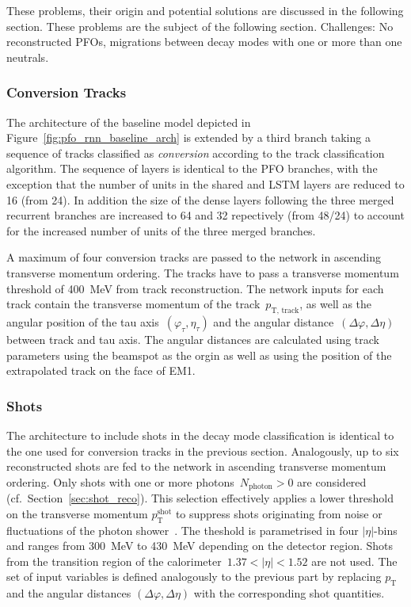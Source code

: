 These problems, their origin and potential solutions are discussed
in the following section.
These problems are the subject of the following section.
Challenges: No reconstructed PFOs, migrations between decay modes with one or
more than one neutrals.


\subsubsection{Conversion Tracks}

The architecture of the baseline model depicted in
Figure~\ref{fig:pfo_rnn_baseline_arch} is extended by a third branch taking a
sequence of tracks classified as \emph{conversion} according to the track
classification algorithm. The sequence of layers is identical to the PFO
branches, with the exception that the number of units in the shared and LSTM
layers are reduced to 16 (from 24). In addition the size of the dense layers
following the three merged recurrent branches are increased to 64 and 32
repectively (from 48/24) to account for the increased number of units of the
three merged branches.

A maximum of four conversion tracks are passed to the network in ascending
transverse momentum ordering. The tracks have to pass a transverse momentum
threshold of \SI{400}{\MeV} from track reconstruction. The network inputs for
each track contain the transverse momentum of the track~$p_\text{T, track}$, as
well as the angular position of the tau axis~$(\varphi_\tau, \eta_\tau)$ and the
angular distance~$(\Delta\varphi, \Delta\eta)$ between track and tau axis. The
angular distances are calculated using track parameters using the beamspot as
the orgin as well as using the position of the extrapolated track on the face of
EM1.

\subsubsection{Shots}
The architecture to include shots in the decay mode classification is identical
to the one used for conversion tracks in the previous section. Analogously, up
to six reconstructed shots are fed to the network in ascending transverse
momentum ordering. Only shots with one or more photons~$N_\text{photon} > 0$ are
considered (cf.\ Section~\ref{sec:shot_reco}). This selection effectively
applies a lower threshold on the transverse momentum $p_\text{T}^\text{shot}$ to
suppress shots originating from noise or fluctuations of the photon
shower~\cite{atlas:taurec:decaymodes}. The theshold is parametrised in four
$|\eta|$-bins and ranges from \SI{300}{\MeV} to \SI{430}{\MeV} depending on the
detector region. Shots from the transition region of the
calorimeter~$1.37 < |\eta| < 1.52$ are not used. The set of input variables is
defined analogously to the previous part by replacing $p_\text{T}$ and the
angular distances $(\Delta\varphi, \Delta\eta)$ with the corresponding shot
quantities.

